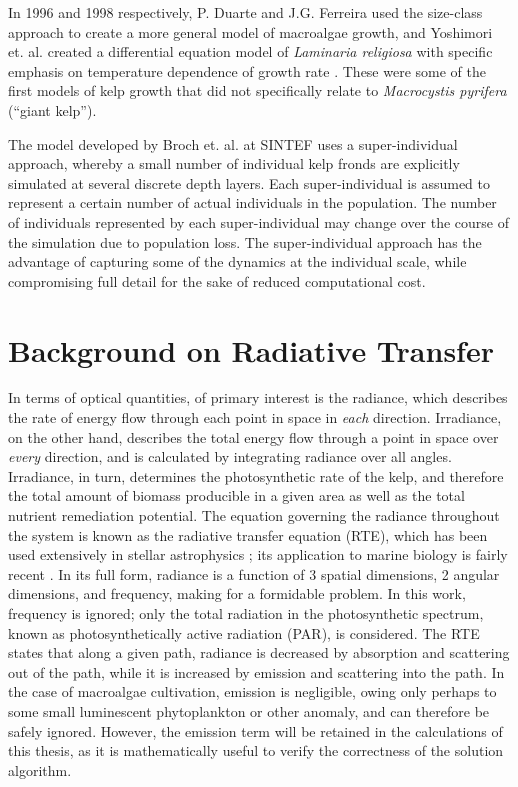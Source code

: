 In 1996 and 1998 respectively, P. Duarte and J.G. Ferreira used the size-class approach to create a more general model of macroalgae growth, and Yoshimori et. al. created a differential equation model of \textit{Laminaria religiosa} with specific emphasis on temperature dependence of growth rate \cite{duarte_model_1997,yoshimori_mathematical_1998}.
These were some of the first models of kelp growth that did not specifically relate to \textit{Macrocystis pyrifera} (``giant kelp'').

The model developed by Broch et. al. at SINTEF \cite{broch_modelling_2012, broch_modelling_2013, handa_seasonal_2013} uses a super-individual approach, whereby a small number of individual kelp fronds are explicitly simulated at several discrete depth layers.
Each super-individual is assumed to represent a certain number of actual individuals in the population.
The number of individuals represented by each super-individual may change over the course of the simulation due to population loss.
The super-individual approach has the advantage of capturing some of the dynamics at the individual scale, while compromising full detail for the sake of reduced computational cost.

\section{Background on Radiative Transfer}
In terms of optical quantities, of primary interest is the radiance, which describes the rate of energy flow through each point in space in \textit{each} direction.
Irradiance, on the other hand, describes the total energy flow through a point in space over \textit{every} direction, and is calculated by integrating radiance over all angles.
Irradiance, in turn, determines the photosynthetic rate of the kelp, and therefore the total amount of biomass producible in a given area as well as the total nutrient remediation potential.
The equation governing the radiance throughout the system is known as the radiative transfer equation (RTE), which has been used extensively in stellar astrophysics \cite{chandrasekhar_radiative_1960,petkova_novel_2011}; its application to marine biology is fairly recent \cite{mobley_radiative_2001}.
In its full form, radiance is a function of 3 spatial dimensions, 2 angular dimensions, and frequency, making for a formidable problem.
In this work, frequency is ignored; only the total radiation in the photosynthetic spectrum, known as photosynthetically active radiation (PAR), is considered.
The RTE states that along a given path, radiance is decreased by absorption and scattering out of the path, while it is increased by emission and scattering into the path.
In the case of macroalgae cultivation, emission is negligible, owing only perhaps to some small luminescent phytoplankton or other anomaly, and can therefore be safely ignored.
However, the emission term will be retained in the calculations of this thesis, as it is mathematically useful to verify the correctness of the solution algorithm.

